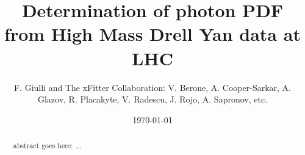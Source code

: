 \documentclass[twocolumn,english,aps]{revtex4-1}
\begin{document}
\title{Determination of photon PDF from High Mass Drell Yan data at LHC}


\author{F. Giulli and The xFitter Collaboration: V. Berone, A. Cooper-Sarkar, A. Glazov, R. Placakyte, V. Radescu,  J. Rojo, A. Sapronov, etc. }


\date{\today}
\begin{abstract}
abstract goes here: ...
\end{abstract}
\maketitle
\tableofcontents{}














\end{document}
